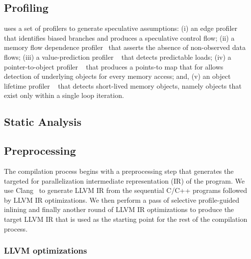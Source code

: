 \subsection{Profiling}

\name uses a set of profilers to generate speculative assumptions:
%
(i) an edge profiler~\cite{LLVM:CGO04} that identifies biased
branches and produces a speculative control flow;
%
(ii) a memory flow dependence profiler~\cite{chen:04:cc} that asserts
the absence of non-observed data flows;
%
(iii) a value-prediction profiler ~\cite{gabbay:97:micro} that detects predictable loads;
%
(iv) a pointer-to-object profiler ~\cite{johnson:12:pldi}
that produces a points-to map that for allows detection of underlying objects
for every memory access; and,
%
(v) an object lifetime profiler ~\cite{johnson:12:pldi}
that detects short-lived memory objects, namely objects that exist only within a
single loop iteration.
%

\subsection {Static Analysis}


% 


\subsection{Preprocessing}

The compilation process begins with a preprocessing step that
generates the targeted for parallelization intermediate representation
(IR) of the program. We use Clang~\cite{LLVM:CGO04} to generate LLVM IR
from the sequential C/C++ programs followed by LLVM IR optimizations.
We then perform a pass of selective profile-guided
inlining and finally another round of LLVM IR optimizations to produce
the target LLVM IR that is used as the starting point for the rest of
the compilation process.

\subsubsection{LLVM optimizations}

